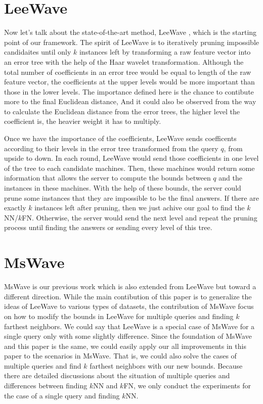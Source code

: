 \section{LeeWave} %
\label{s:leewave}
Now let's talk about the state-of-the-art method, LeeWave \cite{LeeWave}, which is the starting point of our framework. The spirit of LeeWave is to iteratively pruning impossible candidaites until only $k$ instances left by transforming a raw feature vector into an error tree with the help of the Haar wavelet transformation. Although the total number of coefficients in an error tree would be equal to length of the raw feature vector, the coefficients at the upper levels would be more important than those in the lower levels.  The importance defined here is the chance to contibute more to the final Euclidean distance,  And it could also be observed from the way to calculate the Euclidean distance from the error trees, the higher level the coefficient is, the heavier weight it has to multiply.

Once we have the importance of the coefficients, LeeWave sends coefficents according to their levels in the error tree transformed from the query $q$, from upside to down. In each round, LeeWave would send those coefficients in one level of the tree to each candidate machines.  Then, these machines would return some information that allows the server to compute the bounds between $q$ and the instances in these machines.  With the help of these bounds, the server could prune some instances that they are impossible to be the final answers.  If there are exactly $k$ instances left after pruning, then we just achive our goal to find the $k$NN/$k$FN.  Otherwise, the server would send the next level and repeat the pruning process until finding the answers or sending every level of this tree.


\section{MsWave} %
\label{s:mswave}
MsWave \cite{MsWave} is our previous work which is also extended from LeeWave but toward a different direction.  While the main contibution of this paper is to generalize the ideas of LeeWave to various types of datasets, the contribution of MsWave focus on how to modify the bounds in LeeWave for multiple queries and finding $k$ farthest neighbors.  We could say that LeeWave is a special case of MsWave for a single query only with some slightly difference.  Since the foundation of MsWave and this paper is the same, we could easily apply our all improvements in this paper to the scenarios in MsWave.  That is, we could also solve the cases of multiple queries and find $k$ farthest neighbors with our new bounds.  Because there are detailed discussions about the situation of multiple queries and differences between finding $k$NN and $k$FN, we only conduct the experiments for the case of a single query and finding $k$NN.

